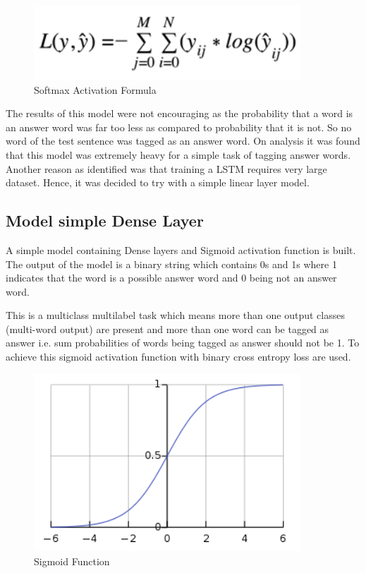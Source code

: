 \begin{figure}
	\caption{Softmax Activation Formula}
	\centering\includegraphics[width=10cm]{6.png}
\end{figure}

The results of this model were not encouraging as the probability that a word is
an answer word was far too less as compared to probability that it is not. So no
word of the test sentence was tagged as an answer word. On analysis it was found
that this model  was extremely heavy for a simple task of tagging answer words.
Another reason as identified was that training a LSTM requires very large
dataset. Hence, it was decided to try with a simple linear layer model.

\subsection{Model simple Dense Layer}
A simple model containing Dense layers and Sigmoid activation function is built.
The output of the model is a binary string which contains 0s and 1s where 1
indicates that the word is a possible answer word and 0 being not an answer
word.

This is a multiclass multilabel task which means more than one output classes
(multi-word output) are present and more than one word can be tagged as answer
i.e. sum probabilities of words being tagged as answer should not be 1. To
achieve this sigmoid activation function with binary cross entropy loss are
used.

\begin{figure}
	\caption{Sigmoid Function}
	\centering\includegraphics[width=10cm]{7.png}
\end{figure}

